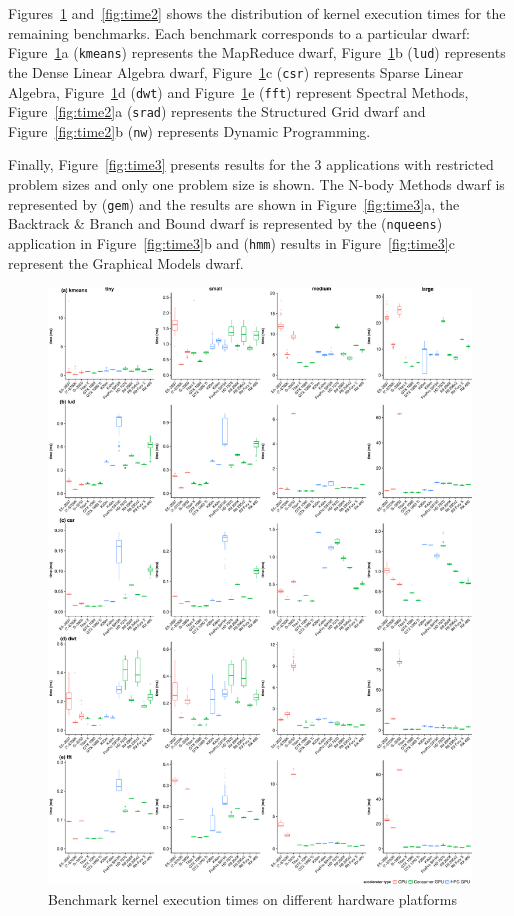 \documentclass[../document.tex]{subfiles}
\begin{document}
Figures~\ref{fig:time} and~\ref{fig:time2} shows the distribution of kernel execution times for the remaining benchmarks.
Each benchmark corresponds to a particular dwarf: 
Figure~\ref{fig:time}a ({\tt kmeans}) represents the MapReduce dwarf,
Figure~\ref{fig:time}b ({\tt lud}) represents the Dense Linear Algebra dwarf,
Figure~\ref{fig:time}c ({\tt csr}) represents Sparse Linear Algebra, 
Figure~\ref{fig:time}d ({\tt dwt}) and Figure~\ref{fig:time}e ({\tt fft}) represent Spectral Methods,
Figure~\ref{fig:time2}a ({\tt srad}) represents the Structured Grid dwarf and Figure~\ref{fig:time2}b ({\tt nw}) represents Dynamic Programming.

Finally, Figure~\ref{fig:time3} presents results for the 3 applications with restricted problem sizes and only one problem size is shown.
The N-body Methods dwarf is represented by ({\tt gem}) and the results are shown in Figure~\ref{fig:time3}a, the Backtrack \& Branch and Bound dwarf is represented by the ({\tt nqueens}) application in Figure~\ref{fig:time3}b and ({\tt hmm}) results in Figure~\ref{fig:time3}c represent the Graphical Models dwarf.


\begin{figure}
    \centering
    \includegraphics[width=.9\textwidth,keepaspectratio]{figures/new-time-results/generate_main_4x5_bandwplot}
    \caption{Benchmark kernel execution times on different hardware platforms}
    \label{fig:time}
\end{figure}
\end{document}
